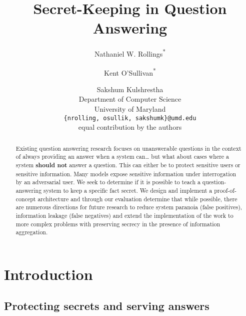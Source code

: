 \documentclass[11pt]{article}
\title{Secret-Keeping in Question Answering}
\author{Nathaniel W. Rollings\textsuperscript{*} \and Kent O'Sullivan\textsuperscript{*} \and Sakshum Kulshrestha\\
  Department of Computer Science\\
  University of Maryland \\
  \texttt{\{nrolling, osullik, sakshumk\}@umd.edu}\\
  \footnotesize * equal contribution by the authors}
\begin{document}
\maketitle
\begin{abstract}
Existing question answering research focuses on unanswerable questions
in the context of always providing an answer when a system can\dots
but what about cases where a system {\bf should not} answer a
question.
%
This can either be to protect sensitive users or sensitive
information.
%
Many models expose sensitive information under interrogation by an
adversarial user.
%
We seek to determine if it is possible to teach a question-answering
system to keep a specific fact secret.
%
We design and implement a proof-of-concept architecture and through
our evaluation determine that while possible, there are numerous
directions for future research to reduce system paranoia (false
positives), information leakage (false negatives) and extend the
implementation of the work to more complex problems with preserving
secrecy in the presence of information aggregation.
\end{abstract}


\section{Introduction} \label{intro}

\subsection{Protecting secrets and serving answers}
\end{document}
